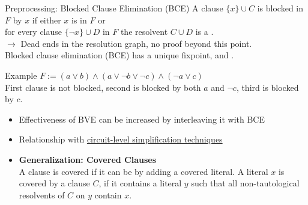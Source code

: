 \documentclass[t]{sdqbeamer}
\begin{document}
    
\begin{frame}{Preprocessing: Blocked Clause Elimination (BCE)}
A clause $\{ x \} \cup C$ is blocked in $F$ by $x$ if either $x$ is  in $F$ or\\
for every clause $\{ \lnot x \} \cup D$ in $F$ the resolvent $C \cup D$ is a .\\[1ex]
$\rightarrow$ Dead ends in the resolution graph, no proof beyond this point.\\[1ex]
Blocked clause elimination (BCE) has a unique fixpoint, and .
\begin{exampleblock}{Example}
$F := (a \lor b) \land (a \lor \lnot b \lor \lnot c) \land (\lnot a \lor c)$\\[1ex]
First clause is not blocked, second is blocked by both $a$ and $\lnot c$, third is blocked by $c$.
\end{exampleblock}
\begin{itemize}\setlength{\itemsep}{1ex}
    \item Effectiveness of BVE can be increased by interleaving it with BCE
    \item Relationship with \href{https://doi.org/10.1007/s10817-011-9239-9}{circuit-level simplification techniques}
    \item \textbf{Generalization: Covered Clauses}\\
    A clause is covered if it can be  by adding a covered literal.
    A literal $x$ is covered by a clause $C$, if it contains a literal $y$ such that all non-tautological resolvents of $C$ on $y$ contain $x$.
\end{itemize}
\end{frame}
\end{document}
